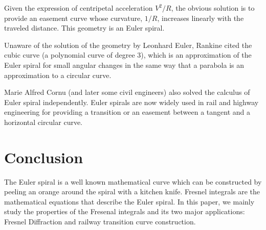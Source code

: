\documentclass[12pt]{article}
\begin{document}
Given the expression of centripetal acceleration $V^{2} / R$, the obvious solution is to provide an easement curve whose curvature, $1/R$, increases linearly with the traveled distance. This geometry is an Euler spiral.

Unaware of the solution of the geometry by Leonhard Euler, Rankine cited the cubic curve (a polynomial curve of degree 3), which is an approximation of the Euler spiral for small angular changes in the same way that a parabola is an approximation to a circular curve.

Marie Alfred Cornu (and later some civil engineers) also solved the calculus of Euler spiral independently. Euler spirals are now widely used in rail and highway engineering for providing a transition or an easement between a tangent and a horizontal circular curve.



\section{Conclusion}
The Euler spiral is a well known mathematical curve which can be constructed by peeling an orange around the spiral with a kitchen knife. Fresnel integrals are the mathematical equations that describe the Euler spiral. In this paper, we mainly study the properties of the Fresenal integrals and its two major applications: Fresnel Diffraction and railway transition curve construction.






\nocite{AS, BE, Sim, Str, WW}  %
\end{document}
